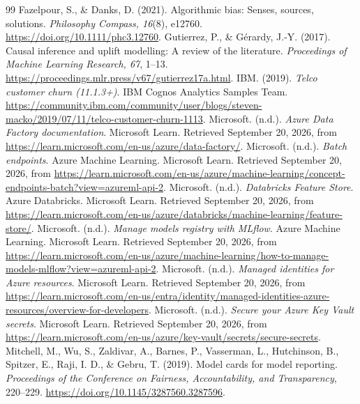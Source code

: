 \documentclass[11pt]{article}
\begin{document}
\newpage
\small
\begin{thebibliography}{99}
\setlength{\itemsep}{5pt}
 Fazelpour, S., \& Danks, D. (2021). Algorithmic bias: Senses, sources, solutions. \textit{Philosophy Compass, 16}(8), e12760. \url{https://doi.org/10.1111/phc3.12760}.
 Gutierrez, P., \& G\'{e}rardy, J.-Y. (2017). Causal inference and uplift modelling: A review of the literature. \textit{Proceedings of Machine Learning Research, 67}, 1--13. \url{https://proceedings.mlr.press/v67/gutierrez17a.html}.
 IBM. (2019). \textit{Telco customer churn (11.1.3+)}. IBM Cognos Analytics Samples Team. \url{https://community.ibm.com/community/user/blogs/steven-macko/2019/07/11/telco-customer-churn-1113}.
 Microsoft. (n.d.). \textit{Azure Data Factory documentation}. Microsoft Learn. Retrieved September 20, 2026, from \url{https://learn.microsoft.com/en-us/azure/data-factory/}.
 Microsoft. (n.d.). \textit{Batch endpoints}. Azure Machine Learning. Microsoft Learn. Retrieved September 20, 2026, from \url{https://learn.microsoft.com/en-us/azure/machine-learning/concept-endpoints-batch?view=azureml-api-2}.
 Microsoft. (n.d.). \textit{Databricks Feature Store}. Azure Databricks. Microsoft Learn. Retrieved September 20, 2026, from \url{https://learn.microsoft.com/en-us/azure/databricks/machine-learning/feature-store/}.
 Microsoft. (n.d.). \textit{Manage models registry with MLflow}. Azure Machine Learning. Microsoft Learn. Retrieved September 20, 2026, from \url{https://learn.microsoft.com/en-us/azure/machine-learning/how-to-manage-models-mlflow?view=azureml-api-2}.
 Microsoft. (n.d.). \textit{Managed identities for Azure resources}. Microsoft Learn. Retrieved September 20, 2026, from \url{https://learn.microsoft.com/en-us/entra/identity/managed-identities-azure-resources/overview-for-developers}.
 Microsoft. (n.d.). \textit{Secure your Azure Key Vault secrets}. Microsoft Learn. Retrieved September 20, 2026, from \url{https://learn.microsoft.com/en-us/azure/key-vault/secrets/secure-secrets}.
 Mitchell, M., Wu, S., Zaldivar, A., Barnes, P., Vasserman, L., Hutchinson, B., Spitzer, E., Raji, I. D., \& Gebru, T. (2019). Model cards for model reporting. \textit{Proceedings of the Conference on Fairness, Accountability, and Transparency}, 220--229. \url{https://doi.org/10.1145/3287560.3287596}.

\end{thebibliography}
\end{document}
